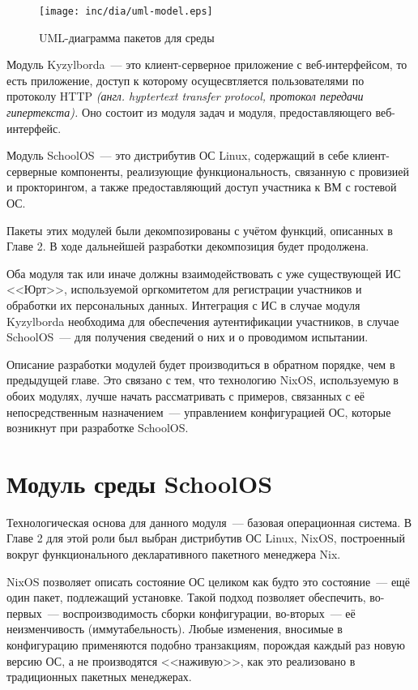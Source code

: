 \begin{figure}[h]
  \centering
  \texttt{[image: inc/dia/uml-model.eps]}
  \caption{UML-диаграмма пакетов для среды}
  \label{fig:uml-model}
\end{figure}

Модуль Kyzylborda~--- это клиент-серверное приложение с веб-интерфейсом, то есть приложение, доступ к которому осущесвтляется пользователями по протоколу HTTP \textit{(англ. hyptertext transfer protocol, протокол передачи гипертекста).} Оно состоит из модуля задач и модуля, предоставляющего веб-интерфейс.

Модуль SchoolOS~--- это дистрибутив ОС Linux, содержащий в себе клиент-серверные компоненты, реализующие функциональность, связанную с провизией и прокторингом, а также предоставляющий доступ участника к ВМ с гостевой ОС.

Пакеты этих модулей были декомпозированы с учётом функций, описанных в Главе 2. В ходе дальнейшей разработки декомпозиция будет продолжена.

Оба модуля так или иначе должны взаимодействовать с уже существующей ИС <<Юрт>>, используемой оргкомитетом для регистрации участников и обработки их персональных данных. Интеграция с ИС в случае модуля Kyzylborda необходима для обеспечения аутентификации участников, в случае SchoolOS~--- для получения сведений о них и о проводимом испытании.

Описание разработки модулей будет производиться в обратном порядке, чем в предыдущей главе. Это связано с тем, что технологию NixOS, используемую в обоих модулях, лучше начать рассматривать с примеров, связанных с её непосредственным назначением~--- управлением конфигурацией ОС, которые возникнут при разработке SchoolOS.

\FloatBarrier

\section{Модуль среды SchoolOS}

Технологическая основа для данного модуля~--- базовая операционная система. В Главе 2 для этой роли был выбран дистрибутив ОС Linux, NixOS, построенный вокруг функционального декларативного пакетного менеджера Nix.

NixOS позволяет описать состояние ОС целиком как будто это состояние~--- ещё один пакет, подлежащий установке. Такой подход позволяет обеспечить, во-первых~--- воспроизводимость сборки конфигурации, во-вторых~--- её неизменчивость (иммутабельность). Любые изменения, вносимые в конфигурацию применяются подобно транзакциям, порождая каждый раз новую версию ОС, а не производятся <<наживую>>, как это реализовано в традиционных пакетных менеджерах.

